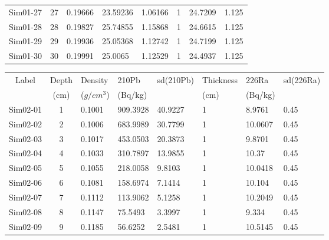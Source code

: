 \documentclass [10pt] {article}
\begin{document}
\begin{table}[H]
\begin{tabular}{c|cllllll}
		Sim01-27 & 27         & 0.19666                         & 23.59236      & 1.06166   & 1              & 24.7209       & 1.125     \\
		Sim01-28 & 28         & 0.19827                         & 25.74855      & 1.15868   & 1              & 24.6615       & 1.125     \\
		Sim01-29 & 29         & 0.19936                         & 25.05368      & 1.12742   & 1              & 24.7199       & 1.125     \\
		Sim01-30 & 30         & 0.19991                         & 25.0065       & 1.12529   & 1              & 24.4937       & 1.125    
	\end{tabular}
\end{table}


\begin{table}[H]
	\begin{tabular}{c|cllllll}
		Label    & Depth& Density& 210Pb & sd(210Pb) & Thickness & 226Ra & sd(226Ra) \\
				& (cm) &($g/cm^3$) &(Bq/kg)& & (cm) & (Bq/kg)&\\
		\hline 
		Sim02-01 & 1          & 0.1001                          & 909.3928      & 40.9227   & 1              & 8.9761        & 0.45      \\
		Sim02-02 & 2          & 0.1006                          & 683.9989      & 30.7799   & 1              & 10.0607       & 0.45      \\
		Sim02-03 & 3          & 0.1017                          & 453.0503      & 20.3873   & 1              & 9.8701        & 0.45      \\
		Sim02-04 & 4          & 0.1033                          & 310.7897      & 13.9855   & 1              & 10.37         & 0.45      \\
		Sim02-05 & 5          & 0.1055                          & 218.0058      & 9.8103    & 1              & 10.0418       & 0.45      \\
		Sim02-06 & 6          & 0.1081                          & 158.6974      & 7.1414    & 1              & 10.104        & 0.45      \\
		Sim02-07 & 7          & 0.1112                          & 113.9062      & 5.1258    & 1              & 10.2049       & 0.45      \\
		Sim02-08 & 8          & 0.1147                          & 75.5493       & 3.3997    & 1              & 9.334         & 0.45      \\
		Sim02-09 & 9          & 0.1185                          & 56.6252       & 2.5481    & 1              & 10.5145       & 0.45      \\

\end{tabular}
\end{table}
\end{document}

